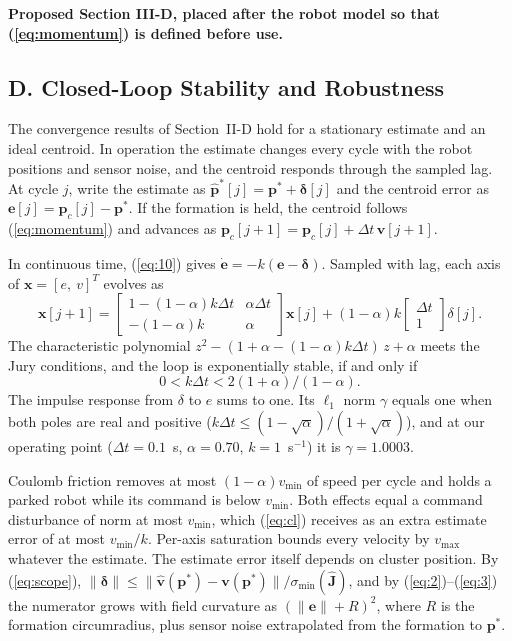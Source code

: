 \documentclass[10pt]{article}
\begin{document}
\setcounter{equation}{11}

\noindent\textbf{Proposed Section III-D, placed after the robot model so that (\ref{eq:momentum}) is defined before use.}

\subsection*{D. Closed-Loop Stability and Robustness}

The convergence results of Section~II-D hold for a stationary estimate and an ideal centroid. In operation the estimate changes every cycle with the robot positions and sensor noise, and the centroid responds through the sampled lag. At cycle $j$, write the estimate as $\hat{\mathbf{p}}^*[j] = \mathbf{p}^* + \boldsymbol{\delta}[j]$ and the centroid error as $\mathbf{e}[j] = \mathbf{p}_c[j] - \mathbf{p}^*$. If the formation is held, the centroid follows (\ref{eq:momentum}) and advances as $\mathbf{p}_c[j+1] = \mathbf{p}_c[j] + \Delta t\,\mathbf{v}[j+1]$.

In continuous time, (\ref{eq:10}) gives $\dot{\mathbf{e}} = -k(\mathbf{e} - \boldsymbol{\delta})$. Sampled with lag, each axis of $\mathbf{x} = [e,\ v]^T$ evolves as
\begin{equation}\label{eq:cl}
\mathbf{x}[j+1] = \begin{bmatrix} 1-(1-\alpha)k\Delta t & \alpha\Delta t \\ -(1-\alpha)k & \alpha \end{bmatrix}\mathbf{x}[j] + (1-\alpha)k\begin{bmatrix}\Delta t\\ 1\end{bmatrix}\delta[j].
\end{equation}
The characteristic polynomial $z^2 - (1+\alpha-(1-\alpha)k\Delta t)\,z + \alpha$ meets the Jury conditions, and the loop is exponentially stable, if and only if
\begin{equation}\label{eq:kmax}
0 < k\Delta t < 2(1+\alpha)/(1-\alpha).
\end{equation}
The impulse response from $\delta$ to $e$ sums to one. Its $\ell_1$ norm $\gamma$ equals one when both poles are real and positive ($k\Delta t \le (1-\sqrt{\alpha})/(1+\sqrt{\alpha})$), and at our operating point ($\Delta t = 0.1$~s, $\alpha = 0.70$, $k = 1$~s$^{-1}$) it is $\gamma = 1.0003$.

Coulomb friction removes at most $(1-\alpha)v_{\min}$ of speed per cycle and holds a parked robot while its command is below $v_{\min}$. Both effects equal a command disturbance of norm at most $v_{\min}$, which (\ref{eq:cl}) receives as an extra estimate error of at most $v_{\min}/k$. Per-axis saturation bounds every velocity by $v_{\max}$ whatever the estimate. The estimate error itself depends on cluster position. By (\ref{eq:scope}), $\|\boldsymbol{\delta}\| \le \|\hat{\mathbf{v}}(\mathbf{p}^*) - \mathbf{v}(\mathbf{p}^*)\|/\sigma_{\min}(\hat{\mathbf{J}})$, and by (\ref{eq:2})--(\ref{eq:3}) the numerator grows with field curvature as $(\|\mathbf{e}\| + R)^2$, where $R$ is the formation circumradius, plus sensor noise extrapolated from the formation to $\mathbf{p}^*$.
\end{document}
